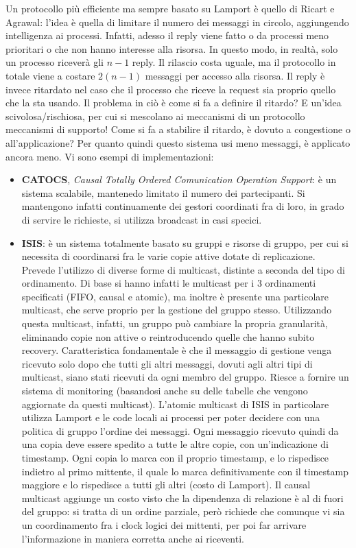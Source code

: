 Un protocollo più efficiente ma sempre basato su Lamport è quello di Ricart e Agrawal: l'idea è quella di limitare il
numero dei messaggi in circolo, aggiungendo intelligenza ai processi. Infatti, adesso il reply viene fatto o da 
processi meno prioritari o che non hanno interesse alla risorsa. In questo modo, in realtà, solo un processo riceverà
gli $n - 1$ reply. Il rilascio costa uguale, ma il protocollo in totale viene a costare $2(n - 1)$ messaggi per accesso
alla risorsa. Il reply è invece ritardato nel caso che il processo che riceve la request sia proprio quello che la
sta usando.
Il problema in ciò è come si fa a definire il ritardo? E un'idea scivolosa/rischiosa, per cui si mescolano ai 
meccanismi di un protocollo meccanismi di supporto!
Come si fa a stabilire il ritardo, è dovuto a congestione o all'applicazione? Per quanto quindi questo sistema usi 
meno messaggi, è applicato ancora meno.
Vi sono esempi di implementazioni:
\begin{itemize}
 \item \textbf{CATOCS}, \textit{Causal Totally Ordered Comunication Operation Support}: è un sistema scalabile,
 mantenedo limitato il numero dei partecipanti. Si mantengono infatti continuamente dei gestori coordinati fra di loro,
 in grado di servire le richieste, si utilizza broadcast in casi specici.
 \item \textbf{ISIS}: è un sistema totalmente basato su gruppi e risorse di gruppo, per cui si necessita di coordinarsi
 fra le varie copie attive dotate di replicazione.
 Prevede l'utilizzo di diverse forme di multicast, distinte a seconda del tipo di ordinamento. Di base si hanno 
 infatti le multicast per i 3 ordinamenti specificati (FIFO, causal e atomic), ma inoltre è presente una particolare
 multicast, che serve proprio per la gestione del gruppo stesso. Utilizzando questa multicast, infatti, un gruppo può
 cambiare la propria granularità, eliminando copie non attive o reintroducendo quelle che hanno subito recovery.
 Caratteristica fondamentale è che il messaggio di gestione venga ricevuto solo dopo che tutti gli altri messaggi,
 dovuti agli altri tipi di multicast, siano stati ricevuti da ogni membro del gruppo. Riesce a fornire un sistema di
 monitoring (basandosi anche su delle tabelle che vengono aggiornate da questi multicast).
 L'atomic multicast di ISIS in particolare utilizza Lamport e le code locali ai processi per poter decidere con una
 politica di gruppo l'ordine dei messaggi. Ogni messaggio ricevuto quindi da una copia deve essere spedito a
 tutte le altre copie, con un'indicazione di timestamp. Ogni copia lo marca con il proprio timestamp, e lo rispedisce
 indietro al primo mittente, il quale lo marca definitivamente con il timestamp maggiore e lo rispedisce a tutti gli
 altri (costo di Lamport).
 Il causal multicast aggiunge un costo visto che la dipendenza di relazione è al di fuori del gruppo: si tratta di un
 ordine parziale, però richiede che comunque vi sia un coordinamento fra i clock logici dei mittenti, per poi
 far arrivare l'informazione in maniera corretta anche ai riceventi.
\end{itemize}
